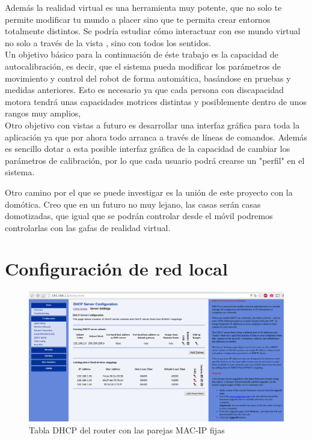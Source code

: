 \documentclass[twoside, 11pt]{epstfg}
\begin{document}
Además la realidad virtual es una herramienta muy potente, que no solo te permite modificar tu mundo a placer sino que te permita crear entornos totalmente distintos. Se podría estudiar cómo interactuar con ese mundo virtual no solo a través de la vista , sino con todos los sentidos.\\Un objetivo básico para la continuación de éste trabajo es la capacidad de autocalibración, es decir, que el sistema pueda modificar los parámetros de movimiento y control del robot de forma automática, basándose en pruebas y medidas anteriores. Esto es necesario ya que cada persona con discapacidad motora tendrá unas capacidades motrices distintas y posiblemente dentro de unos rangos muy amplios,\\
Otro objetivo con vistas a futuro es desarrollar una interfaz gráfica para toda la aplicación ya que por ahora todo arranca a través de líneas de comandos. Además es sencillo dotar a esta posible interfaz gráfica de la capacidad de cambiar los parámetros de calibración, por lo que cada usuario podrá crearse un "perfil" en el sistema.

Otro camino por el que se puede investigar es la unión de este proyecto con la domótica.
Creo que en un futuro no muy lejano, las casas serán casas domotizadas, que igual que se podrán controlar desde el móvil podremos controlarlas con las gafas de realidad virtual.


\nocite{*}
{}

\appendix
\chapter{Configuración de red local}

\begin{figure}[H]
	\centerline{
		\mbox{\includegraphics[width=.95\textwidth]{images/TablaDHCP2.png}}
	}
	\caption{Tabla DHCP del router con las parejas MAC-IP fijas}
	\label{Tabla DHPC}
\end{figure}
\end{document}
